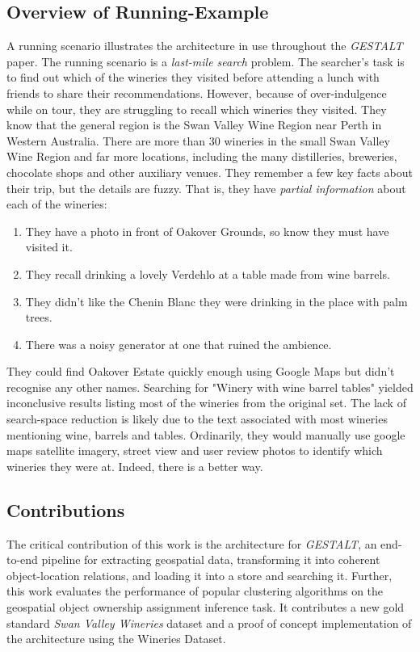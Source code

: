 \subsection{Overview of Running-Example}
A running scenario illustrates the architecture in use throughout the \textit{GESTALT} paper. 
The running scenario is a \textit{last-mile search} problem. The searcher's task is to find out which of the wineries they visited before attending a lunch with friends to share their recommendations. 
However, because of over-indulgence while on tour, they are struggling to recall which wineries they visited.
They know that the general region is the Swan Valley Wine Region near Perth in Western Australia. There are more than 30 wineries in the small Swan Valley Wine Region and far more locations, including the many distilleries, breweries, chocolate shops and other auxiliary venues. 
They remember a few key facts about their trip, but the details are fuzzy. That is, they have \textit{partial information} about each of the wineries:
\begin{enumerate}
	\item They have a photo in front of Oakover Grounds, so know they must have visited it. 
	\item They recall drinking a lovely Verdehlo at a table made from wine barrels. 
	\item They didn't like the Chenin Blanc they were drinking in the place with palm trees.
	\item There was a noisy generator at one that ruined the ambience. 
\end{enumerate}	
They could find Oakover Estate quickly enough using Google Maps but didn't recognise any other names. 
Searching for "Winery with wine barrel tables" yielded inconclusive results listing most of the wineries from the original set. The lack of search-space reduction is likely due to the text associated with most wineries mentioning wine, barrels and tables. 
Ordinarily, they would manually use google maps satellite imagery, street view and user review photos to identify which wineries they were at. 
Indeed, there is a better way.

\subsection{Contributions}
The critical contribution of this work is the architecture for \textit{GESTALT}, an end-to-end pipeline for extracting geospatial data, transforming it into coherent object-location relations, and loading it into a store and searching it. Further, this work evaluates the performance of popular clustering algorithms on the geospatial object ownership assignment inference task. It contributes a new gold standard \textit{Swan Valley Wineries} dataset and a proof of concept implementation of the architecture using the Wineries Dataset.

